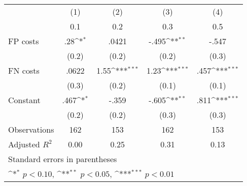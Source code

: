 {
\def\sym#1{\ifmmode^{#1}\else\(^{#1}\)\fi}
\begin{tabular}{l*{4}{c}}
\hline\hline
                &\multicolumn{1}{c}{(1)}&\multicolumn{1}{c}{(2)}&\multicolumn{1}{c}{(3)}&\multicolumn{1}{c}{(4)}\\
                &\multicolumn{1}{c}{0.1}&\multicolumn{1}{c}{0.2}&\multicolumn{1}{c}{0.3}&\multicolumn{1}{c}{0.5}\\
\hline
FP costs        &      .28\sym{*}  &    .0421         &    -.495\sym{**} &    -.547         \\
                &    (0.2)         &    (0.2)         &    (0.2)         &    (0.3)         \\
FN costs        &    .0622         &     1.55\sym{***}&     1.23\sym{***}&     .457\sym{***}\\
                &    (0.3)         &    (0.2)         &    (0.1)         &    (0.1)         \\
Constant        &     .467\sym{*}  &    -.359         &    -.605\sym{**} &     .811\sym{***}\\
                &    (0.2)         &    (0.2)         &    (0.3)         &    (0.3)         \\
\hline
Observations    &      162         &      153         &      162         &      153         \\
Adjusted \(R^{2}\)&     0.00         &     0.25         &     0.31         &     0.13         \\
\hline\hline
\multicolumn{5}{l}{\footnotesize Standard errors in parentheses}\\
\multicolumn{5}{l}{\footnotesize \sym{*} \(p<0.10\), \sym{**} \(p<0.05\), \sym{***} \(p<0.01\)}\\
\end{tabular}
}

